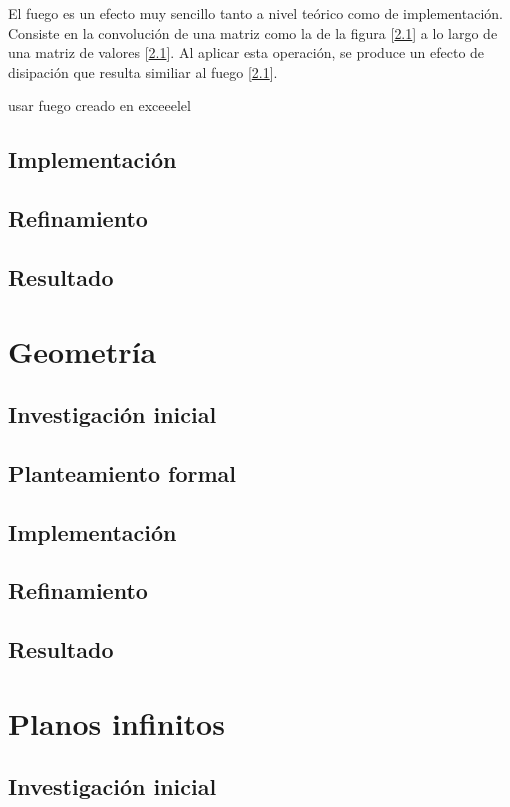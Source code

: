 El fuego es un efecto muy sencillo tanto a nivel teórico como de implementación. Consiste en la convolución de una matriz como la de la figura [\ref{}] a lo largo de una matriz de valores [\ref{}]. Al aplicar esta operación, se produce un efecto de disipación que resulta similiar al fuego [\ref{}].

usar fuego creado en exceeelel

\subsection{Implementación}
\subsection{Refinamiento}
\subsection{Resultado}

\section{Geometría}

\subsection{Investigación inicial}
\subsection{Planteamiento formal}
\subsection{Implementación}
\subsection{Refinamiento}
\subsection{Resultado}

\section{Planos infinitos}

\subsection{Investigación inicial}
